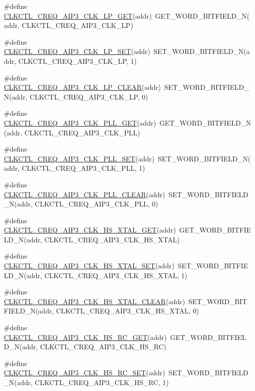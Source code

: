 \begin{DoxyCompactItemize}
\#define \hyperlink{a00544_a1764d6f080c62ff6b7464a64c291be75}{CLKCTL\_\-CREQ\_\-AIP3\_\-CLK\_\-LP\_\-GET}(addr)~GET\_\-WORD\_\-BITFIELD\_\-N(addr, CLKCTL\_\-CREQ\_\-AIP3\_\-CLK\_\-LP)
\item 
\#define \hyperlink{a00544_a1010207cbace987171b6f8c2091cdca7}{CLKCTL\_\-CREQ\_\-AIP3\_\-CLK\_\-LP\_\-SET}(addr)~SET\_\-WORD\_\-BITFIELD\_\-N(addr, CLKCTL\_\-CREQ\_\-AIP3\_\-CLK\_\-LP, 1)
\item 
\#define \hyperlink{a00544_a37985e5949adc1f71364fe4b70ec36dd}{CLKCTL\_\-CREQ\_\-AIP3\_\-CLK\_\-LP\_\-CLEAR}(addr)~SET\_\-WORD\_\-BITFIELD\_\-N(addr, CLKCTL\_\-CREQ\_\-AIP3\_\-CLK\_\-LP, 0)
\item 
\#define \hyperlink{a00544_a98beceace36c0459a86084b19bca4222}{CLKCTL\_\-CREQ\_\-AIP3\_\-CLK\_\-PLL\_\-GET}(addr)~GET\_\-WORD\_\-BITFIELD\_\-N(addr, CLKCTL\_\-CREQ\_\-AIP3\_\-CLK\_\-PLL)
\item 
\#define \hyperlink{a00544_adf90152f15dfab005cdb23ebf1aa8b8d}{CLKCTL\_\-CREQ\_\-AIP3\_\-CLK\_\-PLL\_\-SET}(addr)~SET\_\-WORD\_\-BITFIELD\_\-N(addr, CLKCTL\_\-CREQ\_\-AIP3\_\-CLK\_\-PLL, 1)
\item 
\#define \hyperlink{a00544_a04a85e763b77f74f72b0e0705126a4bf}{CLKCTL\_\-CREQ\_\-AIP3\_\-CLK\_\-PLL\_\-CLEAR}(addr)~SET\_\-WORD\_\-BITFIELD\_\-N(addr, CLKCTL\_\-CREQ\_\-AIP3\_\-CLK\_\-PLL, 0)
\item 
\#define \hyperlink{a00544_a498136aeb85629ec1a77d6052a93fd36}{CLKCTL\_\-CREQ\_\-AIP3\_\-CLK\_\-HS\_\-XTAL\_\-GET}(addr)~GET\_\-WORD\_\-BITFIELD\_\-N(addr, CLKCTL\_\-CREQ\_\-AIP3\_\-CLK\_\-HS\_\-XTAL)
\item 
\#define \hyperlink{a00544_a616c5ef38dc63ea538b68fd0da03a48a}{CLKCTL\_\-CREQ\_\-AIP3\_\-CLK\_\-HS\_\-XTAL\_\-SET}(addr)~SET\_\-WORD\_\-BITFIELD\_\-N(addr, CLKCTL\_\-CREQ\_\-AIP3\_\-CLK\_\-HS\_\-XTAL, 1)
\item 
\#define \hyperlink{a00544_af534df5d16cb583ab266be72275c61bd}{CLKCTL\_\-CREQ\_\-AIP3\_\-CLK\_\-HS\_\-XTAL\_\-CLEAR}(addr)~SET\_\-WORD\_\-BITFIELD\_\-N(addr, CLKCTL\_\-CREQ\_\-AIP3\_\-CLK\_\-HS\_\-XTAL, 0)
\item 
\#define \hyperlink{a00544_a96d2da113dcd919846dce84e02381896}{CLKCTL\_\-CREQ\_\-AIP3\_\-CLK\_\-HS\_\-RC\_\-GET}(addr)~GET\_\-WORD\_\-BITFIELD\_\-N(addr, CLKCTL\_\-CREQ\_\-AIP3\_\-CLK\_\-HS\_\-RC)
\item 
\#define \hyperlink{a00544_a33e86b68fb83a474c0d3251b45d13d1e}{CLKCTL\_\-CREQ\_\-AIP3\_\-CLK\_\-HS\_\-RC\_\-SET}(addr)~SET\_\-WORD\_\-BITFIELD\_\-N(addr, CLKCTL\_\-CREQ\_\-AIP3\_\-CLK\_\-HS\_\-RC, 1)
\item 

\end{DoxyCompactItemize}
